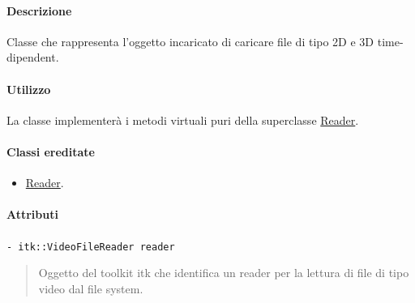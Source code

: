 \paragraph{Descrizione \\}
Classe che rappresenta l'oggetto incaricato di caricare file di tipo 2D e 3D time-dipendent.
\paragraph{Utilizzo\\}
La classe implementerà i metodi virtuali puri della superclasse \hyperref[spereader]{Reader}.
\paragraph{Classi ereditate\\}
\begin{itemize}
\item \hyperref[spereader]{Reader}.
\end{itemize}
\paragraph{\color{black}Attributi \\}
\color{teal}\verb!- itk::VideoFileReader reader!
\begin{quote}
\color{black}Oggetto del toolkit itk che identifica un reader per la lettura di file di tipo video dal file system.
\end{quote}
